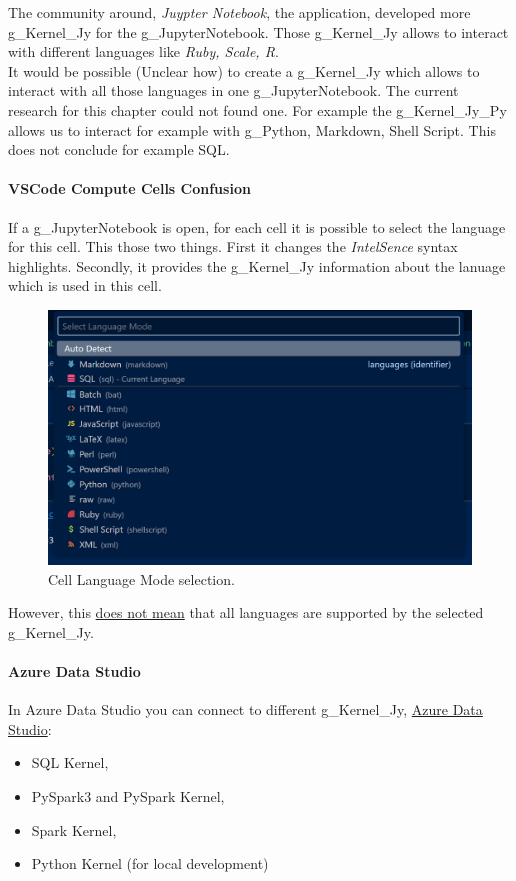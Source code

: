 The community around, \textit{Juypter Notebook}, the application, developed more \gls{g_Kernel_Jy} for the \gls{g_JupyterNotebook}. Those \gls{g_Kernel_Jy} allows to interact with different languages like \textit{Ruby, Scale, R}.\\

It would be possible (Unclear how) to create a \gls{g_Kernel_Jy} which allows to interact with all those languages in one \gls{g_JupyterNotebook}. The current research for this chapter could not found one. For example the \gls{g_Kernel_Jy_Py} allows us to interact for example with \gls{g_Python}, Markdown, Shell Script. This does not conclude for example \gls{SQL}.

\paragraph{VSCode Compute Cells Confusion}
If a \gls{g_JupyterNotebook} is open, for each cell it is possible to select the language for this cell. This those two things. First it changes the \textit{IntelSence} syntax highlights. Secondly, it provides the \gls{g_Kernel_Jy} information about the lanuage which is used in this cell.

\begin{figure}[H]
	\centering
	\includegraphics[scale = 0.3]{attachment/chapter_AML/Scc007}
	\caption{Cell Language Mode selection.}
\end{figure}

However, this \underline{does not mean} that all languages are supported by the selected \gls{g_Kernel_Jy}. 

\paragraph{Azure Data Studio}
In Azure Data Studio you can connect to different \gls{g_Kernel_Jy}, \href{
https://learn.microsoft.com/en-us/azure-data-studio/notebooks/notebooks-guidance?view=sql-server-ver15}{Azure Data Studio}:
\begin{itemize}
	\item \gls{SQL} Kernel,
	\item PySpark3 and PySpark Kernel,
	\item Spark Kernel,
	\item Python Kernel (for local development)
\end{itemize}


